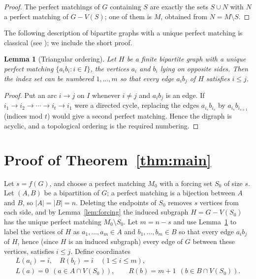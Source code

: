 \documentclass[11pt]{amsart}
\newtheorem{lemma}[theorem]{Lemma}
\theoremstyle{remark}
\begin{document}
\begin{proof}
The perfect matchings of $G$ containing $S$ are exactly the sets $S\cup N$ with $N$ a perfect matching of $G-V(S)$; one of them is $M$, obtained from $N=M\setminus S$.
\end{proof}

The following description of bipartite graphs with a unique perfect matching is classical (see \cite[Ch.~4]{LP}); we include the short proof.

\begin{lemma}[Triangular ordering]\label{lem:triangular}
Let $H$ be a finite bipartite graph with a unique perfect matching $\{a_ib_i: i\in I\}$, the vertices $a_i$ and $b_i$ lying on opposite sides.
Then the index set can be numbered $1,\dots,m$ so that every edge $a_ib_j$ of $H$ satisfies $i\le j$.
\end{lemma}

\begin{proof}
Put an arc $i\to j$ on $I$ whenever $i\ne j$ and $a_ib_j$ is an edge.
If $i_1\to i_2\to\cdots\to i_t\to i_1$ were a directed cycle, replacing the edges $a_{i_s}b_{i_s}$ by $a_{i_s}b_{i_{s+1}}$ (indices mod $t$) would give a second perfect matching.
Hence the digraph is acyclic, and a topological ordering is the required numbering.
\end{proof}

\section{Proof of Theorem~\ref{thm:main}}

Let $s=f(G)$, and choose a perfect matching $M_0$ with a forcing set $S_0$ of size $s$.
Let $(A,B)$ be a bipartition of $G$; a perfect matching is a bijection between $A$ and $B$, so $|A|=|B|=n$.
Deleting the endpoints of $S_0$ removes $s$ vertices from each side, and by Lemma~\ref{lem:forcing} the induced subgraph $H=G-V(S_0)$ has the unique perfect matching $M_0\setminus S_0$.
Let $m=n-s$ and use Lemma~\ref{lem:triangular} to label the vertices of $H$ as $a_1,\dots,a_m\in A$ and $b_1,\dots,b_m\in B$ so that every edge $a_ib_j$ of $H$, hence (since $H$ is an induced subgraph) every edge of $G$ between these vertices, satisfies $i\le j$.
Define coordinates
\begin{gather*}
L(a_i)=i,\quad R(b_i)=i\quad(1\le i\le m),\\
L(a)=0\ \ (a\in A\cap V(S_0)),\qquad R(b)=m+1\ \ (b\in B\cap V(S_0)).
\end{gather*}
\end{document}

